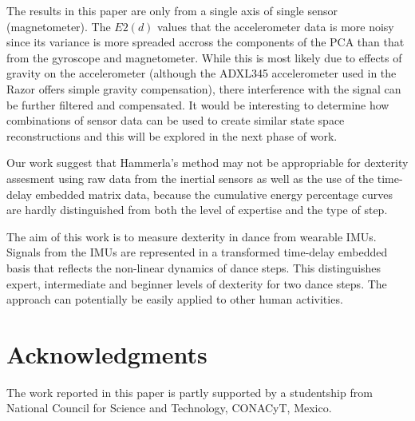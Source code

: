 \documentclass{sigchi}
\begin{document}
The results in this paper are only from a single axis of single sensor (magnetometer). 
The $E2(d)$ values that the accelerometer data is more noisy since its variance is 
more spreaded accross the components of the PCA than that from the gyroscope and magnetometer.  
While this is most likely due to effects of gravity on the accelerometer 
(although the ADXL345 accelerometer used in the Razor offers simple gravity compensation), 
there interference with the signal can be further filtered and compensated.  
It would be interesting to determine how combinations of sensor data can be used to create similar 
state space reconstructions and this will be explored in the next phase of work. 

Our work suggest that Hammerla's method may not be appropriable for dexterity assesment using 
raw data from the inertial sensors as well as the use of the time-delay embedded matrix data,
because the cumulative energy percentage curves are hardly distinguished from 
both the level of expertise and the type of step.

The aim of this work is to measure dexterity in dance from wearable IMUs. Signals from the IMUs are represented
in a transformed time-delay embedded basis that reflects the non-linear dynamics of dance steps. 
This distinguishes expert, intermediate and beginner levels of dexterity for two dance steps.
The approach can potentially be easily applied to other human activities.



\section{Acknowledgments}
The work reported in this paper is partly supported by a studentship from
National Council for Science and Technology, CONACyT, Mexico.



%
%
%
%
%
\balance





\end{document}
